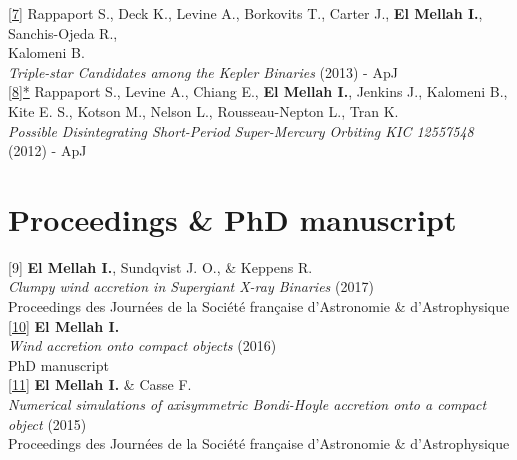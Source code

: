 \begin{flushleft}
\href{http://iopscience.iop.org/article/10.1088/0004-637X/768/1/33/meta}{[7]} Rappaport S., Deck K., Levine A., Borkovits T., Carter J., \textbf{El Mellah I.}, Sanchis-Ojeda R., \\ Kalomeni B.\\ 
\emph{Triple-star Candidates among the Kepler Binaries} (2013) - ApJ\\
\vspace*{0.3cm}
\href{http://iopscience.iop.org/article/10.1088/0004-637X/752/1/1}{[8]*} Rappaport S., Levine A., Chiang E., \textbf{El Mellah I.}, Jenkins J., Kalomeni B.,\\
Kite E. S., Kotson M., Nelson L., Rousseau-Nepton L., Tran K. \\ 
\emph{Possible Disintegrating Short-Period Super-Mercury Orbiting KIC 12557548} (2012) - ApJ \\

\end{flushleft}


\section*{Proceedings \& PhD manuscript}

\begin{flushleft}

[9] \textbf{El Mellah I.}, Sundqvist J. O., \& Keppens R. \\ 
\emph{Clumpy wind accretion in Supergiant X-ray Binaries} (2017)\\
Proceedings des Journ\'ees de la Soci\'et\'e fran\c caise d'Astronomie \& d'Astrophysique\\
\vspace*{0.3cm}
\href{http://adsabs.harvard.edu/abs/2017arXiv170709165E}{[10]} \textbf{El Mellah I.}\\ 
\emph{Wind accretion onto compact objects} (2016)\\
PhD manuscript\\
\vspace*{0.3cm}
\href{http://adsabs.harvard.edu/abs/2015sf2a.conf..325E}{[11]} \textbf{El Mellah I.} \& Casse F. \\ 
\emph{Numerical simulations of axisymmetric Bondi-Hoyle accretion onto a compact object} (2015)\\
Proceedings des Journ\'ees de la Soci\'et\'e fran\c caise d'Astronomie \& d'Astrophysique\\
\vspace*{0.3cm}

\end{flushleft}

